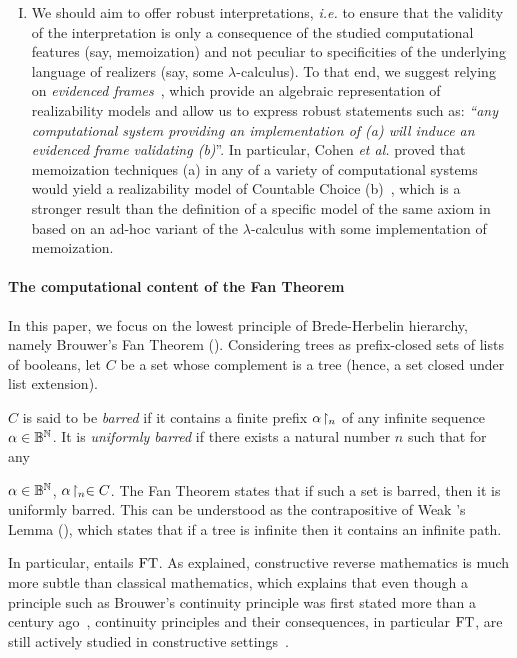 \documentclass[a4paper,UKenglish,cleveref, autoref, thm-restate]{lipics-v2021}
\begin{document}
\begin{enumerate}[(I)]
\item We should aim to offer robust interpretations, \emph{i.e.} to ensure that the validity of the interpretation is only a consequence of the studied computational features (say, memoization) and not peculiar to specificities of the underlying language of realizers (say, some $\lambda$-calculus). To that end, we suggest relying on \emph{evidenced frames}~\cite{CohMiqTat21}, which provide an algebraic representation of realizability models and allow us to express robust statements such as:
\emph{``any computational system providing an implementation of \emph{(a)} will induce an evidenced frame validating \emph{(b)}}''. In particular, Cohen \emph{et al.} proved that memoization techniques (a) in any of a variety of computational systems would yield a realizability model of Countable Choice (b)~\cite{CohFarTat19,CohMiqTat21}, which is a stronger result than the definition of a specific model of the same axiom in ~\cite{Herbelin12,Miquey18a} based on an ad-hoc variant of the $\lambda$-calculus with some implementation of memoization.
\end{enumerate}









\paragraph*{The computational content of the Fan Theorem}


In this paper, we focus on the lowest principle of Brede-Herbelin hierarchy, namely Brouwer's Fan Theorem (\FT). Considering trees as prefix-closed sets of lists of booleans, let $C$ be a set whose complement is a tree (hence, a set closed under list extension).



$C$ is said to be \emph{barred} if it contains a finite prefix ${\alpha}\!\upharpoonright_{n}$ of any infinite sequence 
$\alpha\in\mathbb B^\mathbb N$. It is \emph{uniformly barred} if there exists a natural number $n$ such that for any

$\alpha\in\mathbb B^\mathbb N$, ${\alpha}\!\upharpoonright_{n}\in C$.
The Fan Theorem states that if such a set is barred, then it is uniformly barred. This can be understood as the contrapositive of Weak \Konig's Lemma (\WKL), which states that if a tree is infinite then it contains an infinite path.

In particular, \WKL entails $\mathrm{FT}$.
As explained, constructive reverse mathematics is much more subtle than classical mathematics, which explains that even though a principle such as Brouwer's continuity principle was first stated more than a century ago~\cite{Brouwer1919}, continuity principles and their consequences, in particular $\mathrm{FT}$, are still actively studied in constructive settings~\cite{VanAttenVanDalen2002,VeldmanBrouwer2022,BergerDecomposition2009,FujiwaraExtensionEquivalenceBrouwers2022,FujiwaraChoicePrinciplesCharacterizing2025,BaiEtAl25,CohRah23}.
\end{document}

